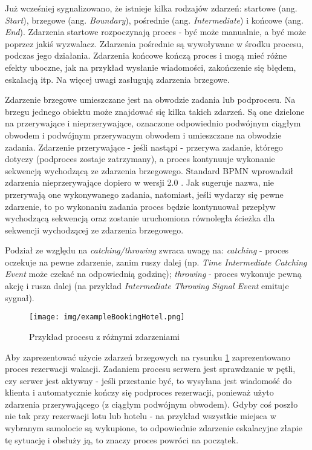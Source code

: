 \documentclass[declaration,shortabstract,mgr]{iithesis}
\newcommand{\bpmn}{BPMN }
\begin{document}
Już wcześniej sygnalizowano, że istnieje kilka rodzajów zdarzeń: startowe (ang. \textit{Start}), brzegowe (ang. \textit{Boundary}), pośrednie (ang. \textit{Intermediate}) i końcowe (ang. \textit{End}). Zdarzenia startowe rozpoczynają proces - być może manualnie, a być może poprzez jakiś wyzwalacz. Zdarzenia pośrednie są wywoływane w środku procesu, podczas jego działania. Zdarzenia końcowe kończą proces i mogą mieć różne efekty uboczne, jak na przykład wysłanie wiadomości, zakończenie się błędem, eskalacją itp. Na więcej uwagi zasługują zdarzenia brzegowe.

Zdarzenie brzegowe umieszczane jest na obwodzie zadania lub podprocesu. Na brzegu jednego obiektu może znajdować się kilka takich zdarzeń. Są one dzielone na przerywające i nieprzerywające, oznaczone odpowiednio podwójnym ciągłym obwodem i podwójnym przerywanym obwodem i umieszczane na obwodzie zadania. Zdarzenie przerywające - jeśli nastąpi - przerywa zadanie, którego dotyczy (podproces zostaje zatrzymany), a proces kontynuuje wykonanie sekwencją wychodzącą ze zdarzenia brzegowego. Standard \bpmn wprowadził zdarzenia nieprzerywające dopiero w wersji 2.0 \cite{bruce-silver-bpmn-boundary-events-v2}. Jak sugeruje nazwa, nie przerywają one wykonywanego zadania, natomiast, jeśli wydarzy się pewne zdarzenie, to po wykonaniu zadania proces będzie kontynuował przepływ wychodzącą sekwencją oraz zostanie uruchomiona równoległa ścieżka dla sekwencji wychodzącej ze zdarzenia brzegowego.

 Podział ze względu na \textit{catching/throwing} zwraca uwagę na: \textit{catching} - proces oczekuje na pewne zdarzenie, zanim ruszy dalej (np. \textit{Time Intermediate Catching Event} może czekać na odpowiednią godzinę); \textit{throwing} - proces wykonuje pewną akcję i rusza dalej (na przykład \textit{Intermediate Throwing Signal Event} emituje sygnał). 

\begin{figure}[H]
    \texttt{[image: img/exampleBookingHotel.png]}
    \caption{Przykład procesu z różnymi zdarzeniami}
    \label{fig:exampleBookingHotel}
\end{figure}

Aby zaprezentować użycie zdarzeń brzegowych na rysunku \ref{fig:exampleBookingHotel} zaprezentowano proces rezerwacji wakacji. Zadaniem procesu serwera jest sprawdzanie w pętli, czy serwer jest aktywny - jeśli przestanie być, to wysyłana jest wiadomość do klienta i automatycznie kończy się podproces rezerwacji, ponieważ użyto zdarzenia przerywającego (z ciągłym podwójnym obwodem). Gdyby coś poszło nie tak przy rezerwacji lotu lub hotelu - na przykład wszystkie miejsca w wybranym samolocie są wykupione, to odpowiednie zdarzenie eskalacyjne złapie tę sytuację i obsłuży ją, to znaczy proces powróci na początek.
\end{document}
